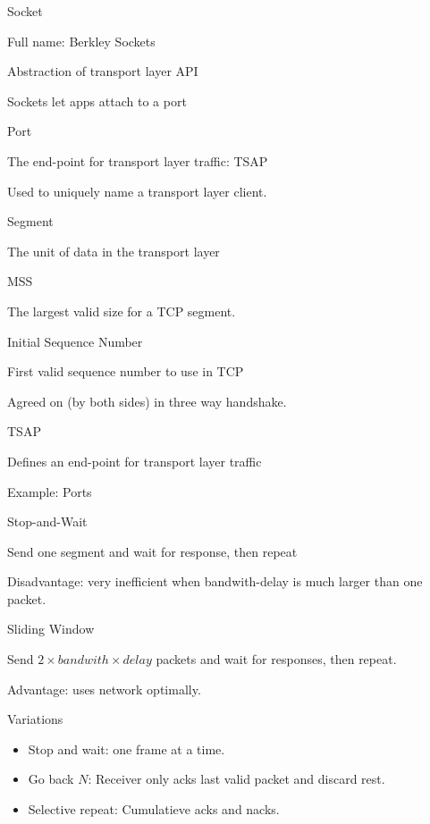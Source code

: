 \documentclass[main.tex]{subfiles}
\begin{document}
\begin{card}{Socket}
\item Full name: Berkley Sockets
\item Abstraction of transport layer API
\item Sockets let apps attach to a port
\end{card}

\begin{card}{Port}
\item The end-point for transport layer traffic: TSAP
\item Used to uniquely name a transport layer client.
\end{card}

\begin{card}{Segment}
\item The unit of data in the transport layer
\end{card}

\begin{card}{MSS}
\item The largest valid size for a TCP segment.
\end{card}

\begin{card}[ISN]{Initial Sequence Number}
\item First valid sequence number to use in TCP
\item Agreed on (by both sides) in three way handshake.
\end{card}

\begin{card}{TSAP}
\item Defines an end-point for transport layer traffic
\item Example: Ports
\end{card}

\begin{card}{Stop-and-Wait}
\item Send one segment and wait for response, then repeat
\item Disadvantage: very inefficient when bandwith-delay is much larger than one packet.
\end{card}

\begin{card}{Sliding Window}
\item Send $2\times bandwith \times delay$ packets and wait for responses, then repeat.
\item Advantage: uses network optimally.
\item Variations
    \begin{itemize}
        \item Stop and wait: one frame at a time.
        \item Go back $N$: Receiver only acks last valid packet and discard rest.
        \item Selective repeat: Cumulatieve acks and nacks.
    \end{itemize}
\end{card}
\end{document}
